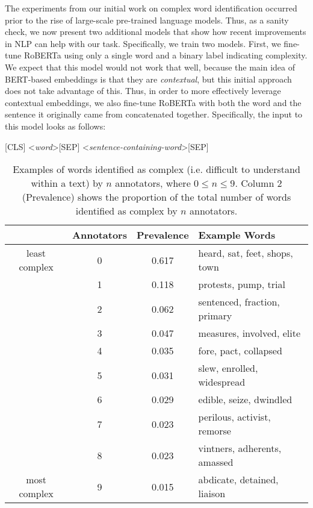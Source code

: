 \documentclass[thesis.tex]{subfiles}
\begin{document}
The experiments from our initial work on complex word identification occurred prior to the rise of large-scale pre-trained language models. Thus, as a sanity check, we now present two additional models that show how recent improvements in NLP can help with our task. Specifically, we train two models. First, we fine-tune RoBERTa \citep{liu2019roberta} using only a single word and a binary label indicating complexity. We expect that this model would not work that well, because the main idea of BERT-based embeddings is that they are \textit{contextual}, but this initial approach does not take advantage of this. Thus, in order to more effectively leverage contextual embeddings, we also fine-tune RoBERTa with both the word and the sentence it originally came from concatenated together. Specifically, the input to this model looks as follows:

\begin{center}
[CLS] \textless \textit{word}\textgreater \text{ }[SEP] \textless \textit{sentence-containing-word}\textgreater \text{ }[SEP]
\end{center}

\begin{table}
    \centering
    \begin{tabular}{|cc|c|l|}
  	\hline
   & \bf Annotators & \bf Prevalence & \bf Example Words \\ \hline
    least complex & 0 & 0.617 & heard, sat, feet, shops, town \\
    & 1 & 0.118 & protests, pump, trial \\
    & 2 & 0.062 & sentenced, fraction, primary \\
    & 3 & 0.047 & measures, involved, elite \\ 
    & 4 & 0.035 & fore, pact, collapsed \\
    & 5 & 0.031 & slew, enrolled, widespread \\
    & 6 & 0.029 & edible, seize, dwindled \\
    & 7 & 0.023 & perilous, activist, remorse \\ 
    & 8 & 0.023 & vintners, adherents, amassed \\
    most complex & 9 & 0.015 & abdicate, detained, liaison \\ \hline
   \end{tabular}
   \caption{Examples of words identified as complex (i.e. difficult to understand within a text) by $n$ annotators, where $0 \leq n \leq 9$. Column 2 (Prevalence) shows the proportion of the total number of words identified as complex by $n$ annotators.}
   \label{tab:cw_turk_examples}
\end{table}
\end{document}
